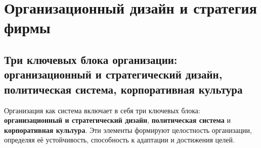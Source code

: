 \section{Организационный дизайн и стратегия фирмы}

\subsection{Три ключевых блока организации: организационный и стратегический дизайн, политическая система, корпоративная культура}

Организация как система включает в себя три ключевых блока: \textbf{организационный и стратегический дизайн}, \textbf{политическая система} и \textbf{корпоративная культура}. Эти элементы формируют целостность организации, определяя её устойчивость, способность к адаптации и достижения целей.

